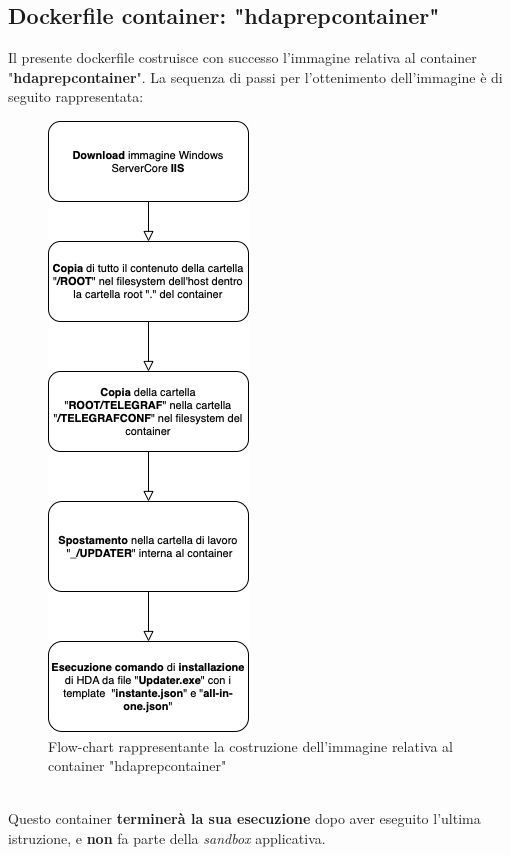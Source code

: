 \subsection{Dockerfile container: "hdaprepcontainer"}
Il presente dockerfile costruisce con successo l'immagine relativa al container "\textbf{hdaprepcontainer}". La sequenza di passi per l'ottenimento dell'immagine è di seguito rappresentata:
\begin{figure}[!h]     
\centering 
    \includegraphics[width=0.3\columnwidth]{immagini/flowchart/flowchart_hdaprepcontainer} 
    \caption{Flow-chart rappresentante la costruzione dell'immagine relativa al container "hdaprepcontainer"}
\end{figure} \\
Questo container \textbf{terminerà la sua esecuzione} dopo aver eseguito l'ultima istruzione, e \textbf{non} fa parte della \textit{sandbox} applicativa.\\
\newpage

